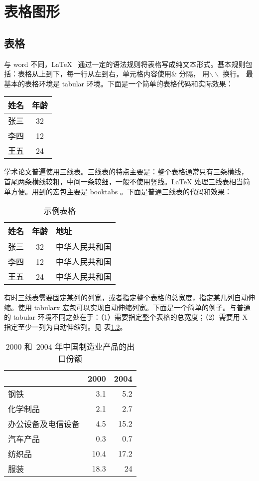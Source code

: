 
\chapter{表格图形}
\label{chap:tabfig}

\section{表格}
与 word 不同，\LaTeX{}~ 通过一定的语法规则将表格写成纯文本形式。基本规则包括：表格从上到下，每一行从左到右，单元格内容使用\& 分隔，
用$\backslash\backslash$ 换行。 最基本的表格环境是 tabular 环境。下面是一个简单的表格代码和实际效果：\\
\begin{center}
\begin{tabular}[t]{l|c}
    \hline
    姓名 & 年龄 \\
    \hline
    张三 & 32 \\
    李四 & 12 \\
    王五 & 24 \\
    \hline
\end{tabular}
\end{center}


学术论文普遍使用三线表。三线表的特点主要是：整个表格通常只有三条横线， 首尾两条横线较粗，中间一条较细，一般不使用竖线。LaTeX 处理三线表相当简 单方便。用到的宏包主要是 booktabs 。下面是普通三线表的代码和效果：
\begin{table}[htbp]
 \caption{\label{tab:test1}示例表格}
 \centering
 \begin{tabular}{lcl}
  \toprule
  姓名 & 年龄 & 地址\\
  \midrule
  张三 & 32 & 中华人民共和国\\
  李四 & 12 & 中华人民共和国\\
  王五 & 24 & 中华人民共和国\\
  \bottomrule
 \end{tabular}
\end{table}

有时三线表需要固定某列的列宽，或者指定整个表格的总宽度，指定某几列自动伸缩。使用 tabularx 宏包可以实现自动伸缩列宽。下面是一个简单的例子。与普通的 tabular 环境不同之处在于：（1）需要指定整个表格的总宽度；（2）需要用 X 指定至少一列为自动伸缩列。见
表\ref{tab:test}。

\begin{table}[htbp]
\centering
\caption{\label{tab:test}2000 和~2004 年中国制造业产品的出口份额}
\begin{tabularx}{10cm}{Xrr}
 \toprule & 2000 & 2004 \\
\midrule 钢铁 & 3.1 & 5.2 \\
 化学制品 & 2.1 & 2.7 \\
 办公设备及电信设备 & 4.5 & 15.2 \\
 汽车产品 & 0.3 & 0.7 \\
纺织品 & 10.4 & 17.2 \\
 服装 & 18.3 & 24\\
 \bottomrule
 \end{tabularx}
\end{table}

